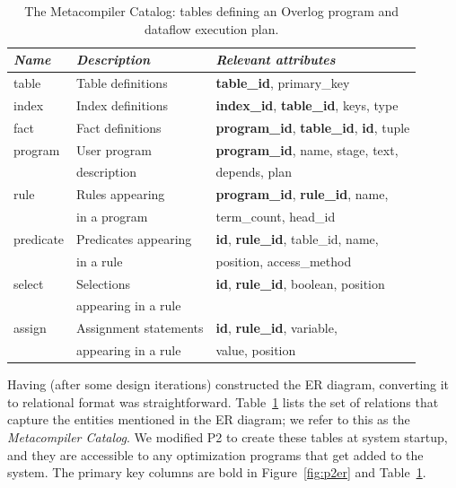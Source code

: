 \documentclass{sigmod08}
\begin{document}
\begin{table}
\centering
\caption{The Metacompiler Catalog: tables defining an Overlog program and dataflow execution plan.}
\label{tbl:tables}
\small{
\begin{tabular}{|l|l|l|} \hline
{\it Name}& {\it Description} & {\it Relevant attributes} \\ \hline\hline
table     & Table definitions & {\bf table\_id}, primary\_key\\ \hline
index     & Index definitions & {\bf index\_id}, {\bf table\_id}, keys, type \\ \hline
fact      & Fact definitions  & {\bf program\_id}, {\bf table\_id}, {\bf id}, tuple\\ \hline
program   & User program      & {\bf program\_id}, name, stage, text,\\
          & description       & depends, plan \\ \hline
rule      & Rules appearing   & {\bf program\_id}, {\bf rule\_id}, name, \\
          & in a program      & term\_count, head\_id \\ \hline
predicate & Predicates appearing & {\bf id}, {\bf rule\_id}, table\_id, name, \\
          & in a rule         & position, access\_method \\ \hline
select    & Selections        & {\bf id}, {\bf rule\_id}, boolean, position \\
          & appearing in a rule &  \\ \hline
assign    & Assignment statements & {\bf id}, {\bf rule\_id}, variable, \\ 
          & appearing in a rule & value, position \\ \hline
\end{tabular}
}
\end{table}

Having (after some design iterations) constructed the ER diagram, converting it to relational format was
straightforward. Table~\ref{tbl:tables} lists the set of relations that capture the entities 
mentioned in the ER diagram; we refer to this as the {\em Metacompiler Catalog}. We modified P2 to create these tables
at system startup, and they are accessible to any optimization programs that get added to the system. The primary key 
columns are bold in  Figure~\ref{fig:p2er} and Table~\ref{tbl:tables}.
\end{document}
